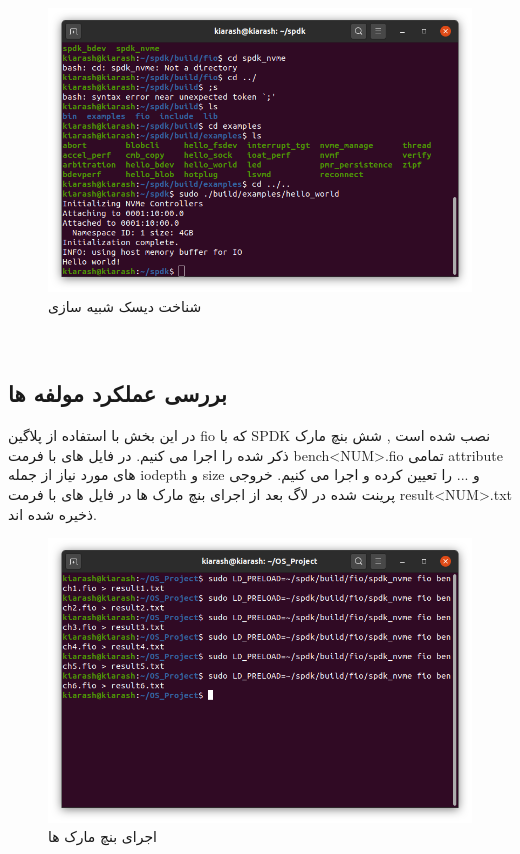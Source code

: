 \begin{figure}[H]
    \centering
    \includegraphics[width=\textwidth]{figs/hello.png}
    \caption{شناخت دیسک شبیه سازی}
\end{figure}

‫‫\subsection*{بررسی عملکرد مولفه ها}
در این بخش با استفاده از پلاگین fio که با SPDK نصب شده است , شش بنچ مارک ذکر شده را اجرا می کنیم. در فایل های با فرمت bench<NUM>.fio تمامی attribute های مورد نیاز از جمله iodepth و size و ... را تعیین کرده و اجرا می کنیم. خروجی پرینت شده در لاگ بعد از اجرای بنچ مارک ها در فایل های با فرمت result<NUM>.txt ذخیره شده اند.

\begin{figure}[H]
    \centering
    \includegraphics[width=\textwidth]{figs/bench.png}
    \caption{اجرای بنچ مارک ها}
\end{figure}

